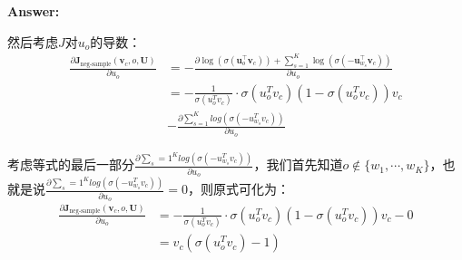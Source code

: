 \documentclass{article}
\newenvironment{answer}{
    {\bf Answer:} \sf \begingroup \color{red}%
}{\par\endgroup}%
\begin{document}
\begin{enumerate}[label=(\alph*)]
\begin{shaded}
\begin{answer}
然后考虑$J$对$u_o$的导数：
\begin{equation}
	\begin{array}{cl}
 \frac{\partial \bm J_{\text{neg-sample}}(\bm v_c, o, \bm U)}{\partial  u_o} &= -\frac{\partial \log(\sigma(\bm u_o^\top \bm v_c)) + \sum_{s=1}^K \log(\sigma(-\bm u_{w_s}^\top \bm v_c)) }{\partial u_o}\\ 	
 &= -\frac{1}{\sigma(u_o^T v_c)} \cdot \sigma(u_o^T v_c) (1- \sigma(u_o^T v_c) ) v_c \\
 & - \frac{\partial \sum_{s=1}^K log(\sigma(-u_{w_s}^T v_c))}{\partial u_o}
 \end{array}
\end{equation}

考虑等式的最后一部分$\frac{\partial \sum_s=1 ^K log(\sigma(-u_{w_s}^T v_c))}{\partial u_o}$，我们首先知道$o \notin \{w_1,\cdots,w_K\}$，也就是说$\frac{\partial \sum_s=1 ^K log(\sigma(-u_{w_s}^T v_c))}{\partial u_o}=0$，则原式可化为：
\begin{equation}
	\begin{array}{cl}
 \frac{\partial \bm J_{\text{neg-sample}}(\bm v_c, o, \bm U)}{\partial  u_{o}} &= -\frac{1}{\sigma(u_o^T v_c)} \cdot \sigma(u_o^T v_c) (1- \sigma(u_o^T v_c) ) v_c - 0\\
 & = v_c(\sigma(u_o^Tv_c)-1)
 \end{array}
\end{equation}


\end{answer}
\end{shaded}
\end{enumerate}
\end{document}
